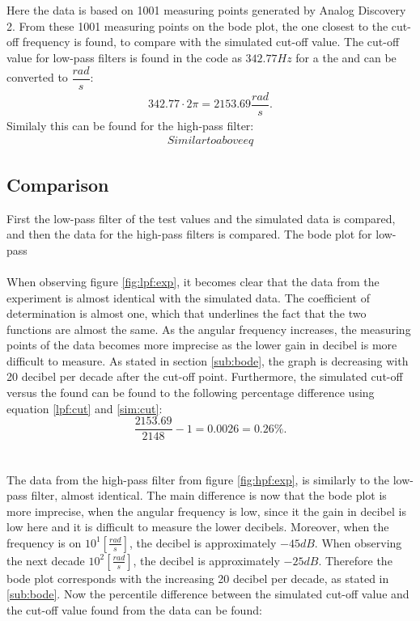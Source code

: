 \\ \\
Here the data is based on 1001 measuring points generated by Analog Discovery 2. From these 1001 measuring points on the bode plot, the one closest to the cut-off frequency is found, to compare with the simulated cut-off value. The cut-off value for low-pass filters is found in the code as $342.77 Hz$ for a the  and can be converted to $\dfrac{rad}{s}$:
\begin{align}
342.77 \cdot 2 \pi = 2153.69 \dfrac{rad}{s}. \label{lpf:cut}
\end{align}
Similaly this can be found for the high-pass filter:
\begin{align}
Similar to above eq
\end{align}
\subsection{Comparison}
First the low-pass filter of the test values and the simulated data is compared, and then the data for the high-pass filters is compared. The bode plot for low-pass 
\\ \\
When observing figure \ref{fig:lpf:exp}, it becomes clear that the data from the experiment is almost identical with the simulated data. The coefficient of determination is almost one, which that underlines the fact that the two functions are almost the same. As the angular frequency increases, the measuring points of the data becomes more imprecise as the lower gain in decibel is more difficult to measure. As stated in section \ref{sub:bode}, the graph is decreasing with 20 decibel per decade after the cut-off point. Furthermore, the simulated cut-off versus the found   can be found to the following percentage difference using equation \eqref{lpf:cut} and \eqref{sim:cut}: $$\dfrac{2153.69}{2148}-1= 0.0026 = 0.26 \%.$$
\\ \\
The data from the high-pass filter from figure \ref{fig:hpf:exp}, is similarly to the low-pass filter, almost identical. The main difference is now that the bode plot is more imprecise, when the angular frequency is low, since it the gain in decibel is low here and it is difficult to measure the lower decibels. Moreover, when the frequency is on $10^{1} \left[\frac{rad}{s} \right]$, the decibel is approximately $-45 dB$. When observing the next decade $10^{2} \left[\frac{rad}{s} \right]$, the decibel is approximately $-25 dB$. Therefore the bode plot corresponds with the increasing 20 decibel per decade, as stated in \ref{sub:bode}. Now the percentile difference between the simulated cut-off value and the cut-off value found from the data can be found: 
